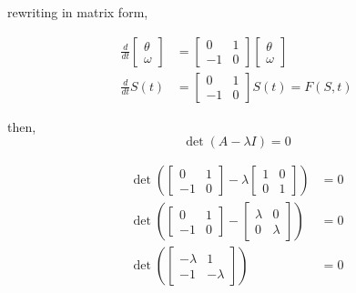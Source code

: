 \documentclass[a4paper,11pt]{report}
\begin{document}
\begin{enumerate}
    rewriting in matrix form,
        
    \begin{equation*}
    \begin{aligned}
    \frac{d}{dt} \begin{bmatrix} \theta \\ \omega \end{bmatrix} &= \begin{bmatrix} 0 & 1 \\ -1 & 0 \end{bmatrix} \begin{bmatrix} \theta \\ \omega \end{bmatrix} \\
    \frac{d}{dt} S(t) &= \begin{bmatrix} 0 & 1 \\ -1 & 0 \end{bmatrix} S(t) = F(S, t)
    \end{aligned}
    \end{equation*}

    then,
    \begin{equation*}
    \det \left( A - \lambda I \right) = 0
    \end{equation*}

    \begin{equation*}
    \begin{aligned}
    \det \left( \begin{bmatrix} 0 & 1 \\ -1 & 0 \end{bmatrix} - \lambda \begin{bmatrix} 1 & 0 \\ 0 & 1 \end{bmatrix} \right) &= 0 \\
    \det \left( \begin{bmatrix} 0 & 1 \\ -1 & 0 \end{bmatrix} - \begin{bmatrix} \lambda & 0 \\ 0 & \lambda \end{bmatrix} \right) &= 0 \\
    \det \left( \begin{bmatrix} - \lambda & 1 \\ -1 & - \lambda \end{bmatrix} \right) &= 0
    \end{aligned}
    \end{equation*}


\end{enumerate}
\end{document}
